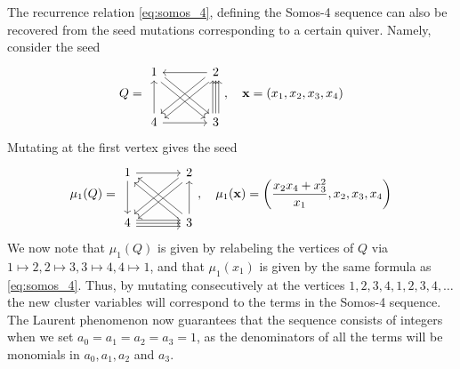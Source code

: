 \begin{example}

	The recurrence relation \cref{eq:somos_4}, defining the Somos-4 sequence can also be recovered from the seed mutations corresponding to a certain
	quiver. Namely, consider the seed
	\begin{equation*}
		Q =
		\begin{tikzcd}[sep=large]
			1 \drar[shift left] \drar[shift right] & 2 \lar \dlar[shift left] \dlar[shift right] \\
			4 \uar \rar & 3 \uar[shift left] \uar \uar[shift right]
		\end{tikzcd}
		,\quad
		\bx = ( x_1, x_2, x_3, x_4)
	\end{equation*}
	Mutating at the first vertex gives the seed
	\begin{equation*}
		\mu_1(Q) =
		\begin{tikzcd}[sep=large]
			1 \dar \rar & 2 \dlar[shift left] \dlar[shift right]  \\
			4 \rar[shift left] \rar[shift right] \rar & 3 \uar \ular[shift left] \ular[shift right]
		\end{tikzcd}
		,\quad
		\mu_1(\bx) = \left( \frac{x_2 x_4 + x_3^2}{x_1}, x_2, x_3, x_4\right)
	\end{equation*}
	We now note that $\mu_1(Q)$ is given by relabeling the vertices of $Q$ via $1 \mapsto
		2, 2 \mapsto 3, 3 \mapsto 4, 4\mapsto 1$, and that $\mu_1(x_1)$ is given by the same
	formula as \cref{eq:somos_4}. Thus, by mutating consecutively at the vertices
	$1,2,3,4,1,2,3,4,\dots$ the new cluster variables will correspond to the terms in the
	Somos-4 sequence. The Laurent phenomenon now guarantees that the sequence consists of
	integers when we set $a_0 = a_1 = a_2 = a_3 = 1$, as the denominators of all the terms
	will be monomials in $a_0, a_1, a_2$ and $a_3$.
\end{example}

